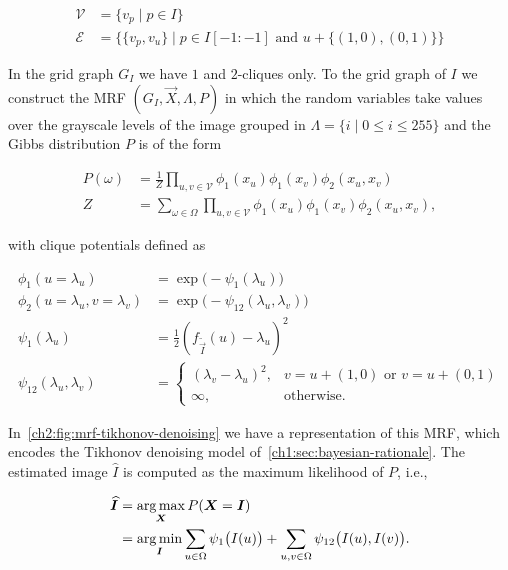 \begin{align*}
	\mathcal{V} &= \{ v_p \; | \; p \in I \} \\
	\mathcal{E} &= \big\{ \{v_p,v_u\} \; | \; p \in I[-1:-1] \text{ and } u + \{(1,0),(0,1)\}  \big\}
\end{align*}

In the grid graph $G_I$ we have $1$ and $2$-cliques only. To the grid graph of $I$ we construct the MRF $(G_I,\vec{X},\Lambda,P)$ in which the random variables take values over the grayscale levels of the image grouped in $\Lambda = \{i \; | \; 0 \leq i \leq 255 \}$ and the Gibbs distribution $P$ is of the form

\begin{align*}
	P(\omega) &= \frac{1}{Z}\prod_{u,v \in \mathcal{V} }{\phi_1(x_u)\phi_1(x_v)\phi_2(x_u,x_v)} \\
	Z &= \sum_{\omega \in \Omega}{ \prod_{u,v \in \mathcal{V} }{\phi_1(x_u)\phi_1(x_v)\phi_2(x_u,x_v)} },
\end{align*}

with clique potentials defined as

\begin{align*}
	\phi_1(u=\lambda _u) &= \exp\big( - \psi_1(\lambda_u) \big) \\
	\phi_2(u=\lambda _u,v=\lambda _v) &= \exp\big( - \psi_{12}(\lambda_u,\lambda_v) \big) \\[1em]
	\psi_{1}(\lambda_u) &=  \frac{1}{2} \left( f_{\widetilde{\vec{I}}}(u) - \lambda _u \right) ^2 \\
	\psi_{12}(\lambda_u, \lambda_v) &= \left\{ \begin{array}{ll} 
 ( \lambda _v - \lambda _u )^2, & v = u + (1,0) \text{ or } v = u + (0,1) \\
 \infty,& \text{otherwise}.
\end{array}\right.	
\end{align*}



In~\cref{ch2:fig:mrf-tikhonov-denoising} we have a representation of this MRF, which encodes the Tikhonov denoising model of~\cref{ch1:sec:bayesian-rationale}. The estimated image $\widehat{I}$ is computed as the maximum likelihood of $P$, i.e.,

\begin{align*}
	\widehat{\bm{I}} &= \operatorname*{arg\,max}_{\bm{X}}{P(\bm{X}=\bm{I})} \\
	&= \operatorname*{arg\,min}_{\bm{I}}{\sum_{u \in \Omega}{\psi_1\big({I(u)}\big)}} + \sum_{u,v \in \Omega}{\psi_{12}\big( {I(u),I(v) \big)}}.
\end{align*}

